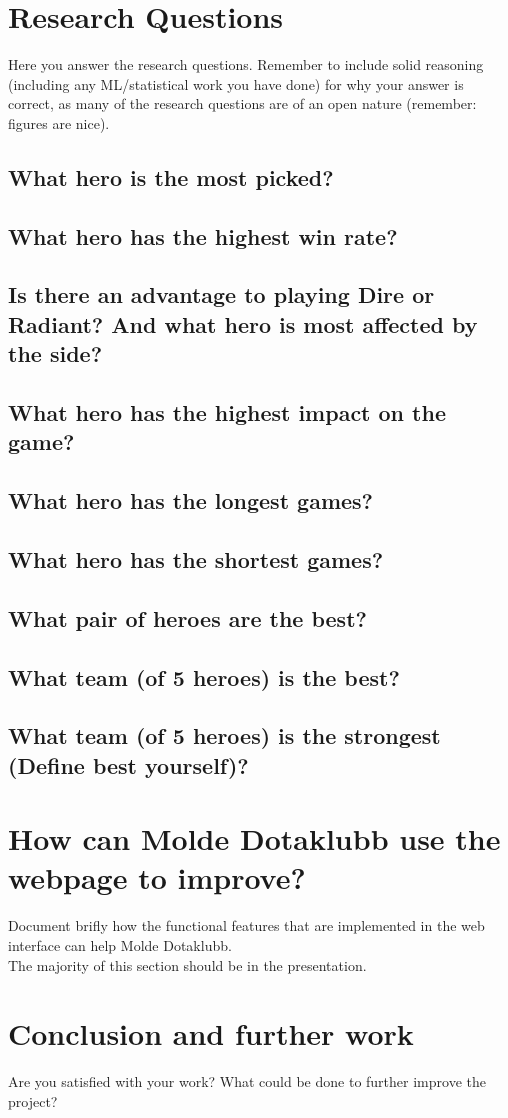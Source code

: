 \documentclass{article}
\begin{document}
\section{Research Questions}
Here you answer the research questions. Remember to include solid reasoning (including any ML/statistical work you have done) for why your answer is correct, as many of the research questions are of an open nature (remember: figures are nice).

\subsection{What hero is the most picked?}
\subsection{What hero has the highest win rate?}
\subsection{Is there an advantage to playing Dire or Radiant? And what hero is most affected by the side?}
\subsection{What hero has the highest impact on the game?}
\subsection{What hero has the longest games?}
\subsection{What hero has the shortest games?}
\subsection{What pair of heroes are the best?}
\subsection{What team (of 5 heroes) is the best?}
\subsection{What team (of 5 heroes) is the strongest (Define best yourself)?}

\section{How can Molde Dotaklubb use the webpage to improve?}
Document brifly how the functional features that are implemented in the web interface can help Molde Dotaklubb.\\
The majority of this section should be in the presentation.


\section{Conclusion and further work}
Are you satisfied with your work? What could be done to further improve the project?
\end{document}
